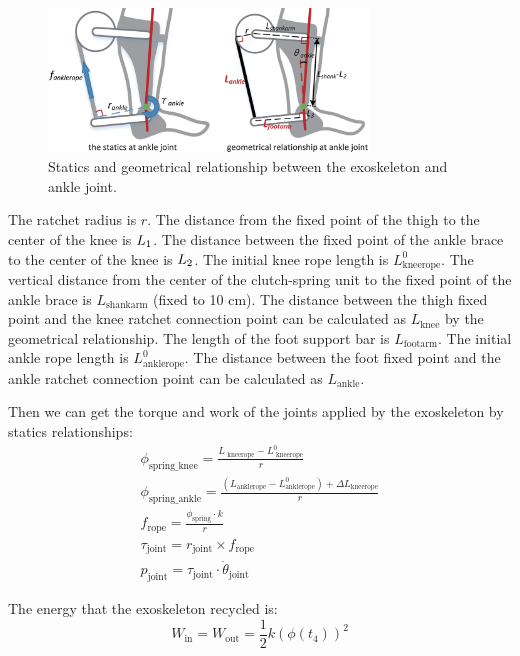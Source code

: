 \documentclass[twocolumn,cleanfoot,10pt]{asme2ej}
\begin{document}
\begin{figure}[t]
	\centering
	\includegraphics[width=8.5cm]{ankleparameters.eps}
	\caption{Statics and geometrical relationship between the exoskeleton and ankle joint.}
	\label{fig:ankleparameters}
\end{figure}


The ratchet radius is $r$. The distance from the fixed point of the thigh to the center of the knee is $L_\textrm1$. The distance between the fixed point of the ankle brace to the center of the knee is $L_\textrm2$. The initial knee rope length is $L_\textrm{kneerope}^0$. The vertical distance from the center of the clutch-spring unit to the fixed point of the ankle brace is $L_\textrm{shankarm}$ (fixed to 10 cm). The distance between the thigh fixed point and the knee ratchet connection point can be calculated as $L_\textrm{knee}$ by the geometrical relationship. The length of the foot support bar is $L_\textrm{footarm}$.  The initial ankle rope length is $L_\textrm{anklerope}^0$. The distance between the foot fixed point and the ankle ratchet connection point can be calculated as $L_\textrm{ankle}$.

Then we can get the torque and work of the joints applied by the exoskeleton by statics relationships:
\begin{gather}
\phi _\textrm{spring\_knee} = \frac{ {L_\textrm{ kneerope}}-{L_\textrm{ kneerope}^0}}{r}\\
\label{eq:kneeforce}
\phi _\textrm{spring\_ankle} = \frac{{({L_\textrm{anklerope}} - L_\textrm{anklerope}^0) + \Delta {L_\textrm{kneerope}}}}{r}\\
\label{eq:ankleforce}
{f_\textrm{rope}} = \frac{{ {\phi _\textrm{spring}} \cdot k}}{r}\\
\label{eq:ankletorque}
{\tau _\textrm{joint}} = {r_\textrm{joint}} \times {f_\textrm{rope}}\\
\label{eq:anklepower}
{p_\textrm{joint}} = {\tau _\textrm{joint}} \cdot {{\dot \theta }_\textrm{joint}}
\end{gather}

The energy that the exoskeleton recycled is:
\begin{equation}
W_\textrm{in}=W_\textrm{out}=\frac{1}{2}k(\phi(t_4))^2
\end{equation}
\end{document}
